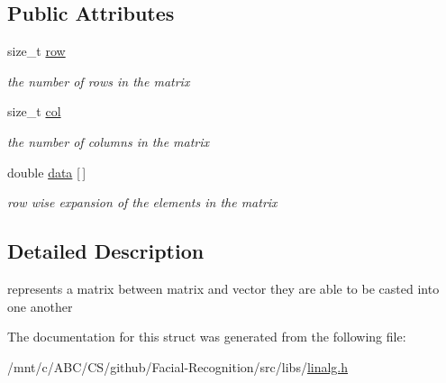 \subsection*{Public Attributes}
\begin{DoxyCompactItemize}
\item 
\hypertarget{struct__matrix_a1087bec6a11b0773b4852c4ca49fc32a}{size\-\_\-t \hyperlink{struct__matrix_a1087bec6a11b0773b4852c4ca49fc32a}{row}}\label{struct__matrix_a1087bec6a11b0773b4852c4ca49fc32a}

\begin{DoxyCompactList}\small\item\em the number of rows in the matrix \end{DoxyCompactList}\item 
\hypertarget{struct__matrix_a7e9feb52cfc0a9d7cba5320abcaa997a}{size\-\_\-t \hyperlink{struct__matrix_a7e9feb52cfc0a9d7cba5320abcaa997a}{col}}\label{struct__matrix_a7e9feb52cfc0a9d7cba5320abcaa997a}

\begin{DoxyCompactList}\small\item\em the number of columns in the matrix \end{DoxyCompactList}\item 
\hypertarget{struct__matrix_ab0c92b382e007327a4cc5fc6818c77a9}{double \hyperlink{struct__matrix_ab0c92b382e007327a4cc5fc6818c77a9}{data} \mbox{[}$\,$\mbox{]}}\label{struct__matrix_ab0c92b382e007327a4cc5fc6818c77a9}

\begin{DoxyCompactList}\small\item\em row wise expansion of the elements in the matrix \end{DoxyCompactList}\end{DoxyCompactItemize}


\subsection{Detailed Description}
represents a matrix between matrix and vector they are able to be casted into one another 

The documentation for this struct was generated from the following file\-:\begin{DoxyCompactItemize}
\item 
/mnt/c/\-A\-B\-C/\-C\-S/github/\-Facial-\/\-Recognition/src/libs/\hyperlink{linalg_8h}{linalg.\-h}\end{DoxyCompactItemize}
